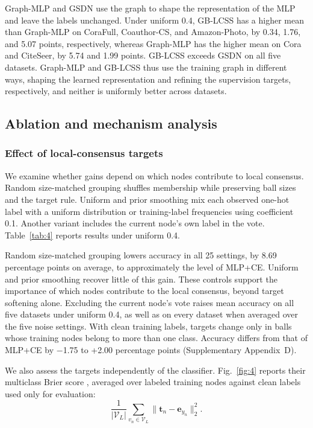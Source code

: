 \documentclass[times,review,10pt]{elsarticle}
\theoremstyle{definition}
\theoremstyle{plain}
\begin{document}
Graph-MLP and GSDN use the graph to shape the representation of the MLP and leave the labels unchanged. Under uniform 0.4, GB-LCSS has a higher mean than Graph-MLP on CoraFull, Coauthor-CS, and Amazon-Photo, by 0.34, 1.76, and 5.07 points, respectively, whereas Graph-MLP has the higher mean on Cora and CiteSeer, by 5.74 and 1.99 points. GB-LCSS exceeds GSDN on all five datasets. Graph-MLP and GB-LCSS thus use the training graph in different ways, shaping the learned representation and refining the supervision targets, respectively, and neither is uniformly better across datasets.

\subsection{Ablation and mechanism analysis}\label{sec:4.3}

\subsubsection{Effect of local-consensus targets}\label{sec:4.3.1}

We examine whether gains depend on which nodes contribute to local consensus. Random size-matched grouping shuffles membership while preserving ball sizes and the target rule. Uniform and prior smoothing mix each observed one-hot label with a uniform distribution or training-label frequencies using coefficient 0.1. Another variant includes the current node's own label in the vote. Table~\ref{tab:4} reports results under uniform 0.4.



Random size-matched grouping lowers accuracy in all 25 settings, by 8.69 percentage points on average, to approximately the level of MLP+CE. Uniform and prior smoothing recover little of this gain. These controls support the importance of which nodes contribute to the local consensus, beyond target softening alone. Excluding the current node's vote raises mean accuracy on all five datasets under uniform 0.4, as well as on every dataset when averaged over the five noise settings. With clean training labels, targets change only in balls whose training nodes belong to more than one class. Accuracy differs from that of MLP+CE by \ensuremath{-}1.75 to +2.00 percentage points (Supplementary Appendix~D).


We also assess the targets independently of the classifier. Fig.~\ref{fig:4} reports their multiclass Brier score \cite{ref73}, averaged over labeled training nodes against clean labels used only for evaluation:
\[
\frac{1}{|\mathcal V_L|}\sum_{v_n\in\mathcal V_L}\lVert\mathbf t_n-\mathbf e_{y_n}\rVert_2^2.
\]
\end{document}

